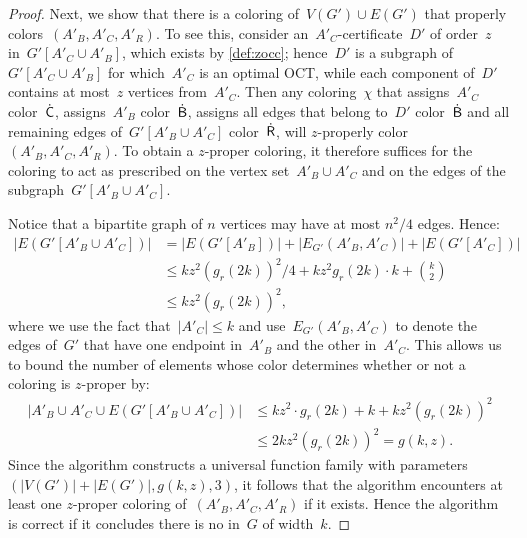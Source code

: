 \begin{proof}
  Next, we show that there is a coloring of~$V(G') \cup E(G')$ that properly colors~$(A'_B, A'_C, A'_R)$. To see this, consider an~$A'_C$-certificate~$D'$ of order~$z$ in~$G'[A'_C \cup A'_B]$, which exists by \cref{def:zocc}; hence~$D'$ is a subgraph of~$G'[A'_C \cup A'_B]$ for which~$A'_C$ is an optimal OCT, while each component of~$D'$ contains at most~$z$ vertices from~$A'_C$. Then any coloring~$\chi$ that assigns~$A'_C$ color~$\mathsf{\dot{C}}$, assigns~$A'_B$ color~$\mathsf{\dot{B}}$, assigns all edges that belong to~$D'$ color~$\mathsf{\dot{B}}$ and all remaining edges of~$G'[A'_B \cup A'_C]$ color~$\mathsf{\dot{R}}$, will $z$-properly color~$(A'_B, A'_C, A'_R)$. To obtain a $z$-proper coloring, it therefore suffices for the coloring to act as prescribed on the vertex set~$A'_B \cup A'_C$ and on the edges of the subgraph~$G'[A'_B \cup A'_C]$. 


  Notice that a bipartite graph of $n$ vertices may have at most $n^2/4$ edges.
  Hence:
	\begin{align*}
	|E(G'[A'_B \cup A'_C])| &= |E(G'[A'_B])| + |E_{G'}(A'_B, A'_C)| + |E(G'[A'_C])| \\
	  &\leq k z^2 (g_r(2k))^2/4 + k z^2 g_r(2k) \cdot k + \binom{k}{2} \\
		& \leq kz^2 (g_r(2k))^2,
	\end{align*}
	where we use the fact that~$|A'_C| \leq k$ and use~$E_{G'}(A'_B, A'_C)$ to denote the edges of~$G'$ that have one endpoint in~$A'_B$ and the other in~$A'_C$.
%
  This allows us to bound the number of elements whose color determines whether or not a coloring is $z$-proper by:
	\begin{align*}
	|A'_B \cup A'_C \cup E(G'[A'_B \cup A'_C])| &\leq k z^2 \cdot g_r(2k) + k + kz^2 (g_r(2k))^2 \\ &\leq 2kz^2 (g_r(2k))^2 = g(k,z).
	\end{align*}
%	
	Since the algorithm constructs a universal function family with parameters~$(|V(G')| + |E(G')|, g(k,z), 3)$, it follows that the algorithm encounters at least one $z$-proper coloring of~$(A'_B, A'_C, A'_R)$ if it exists. Hence the algorithm is correct if it concludes there is no \zocc in~$G$ of width~$k$.
\end{proof}
